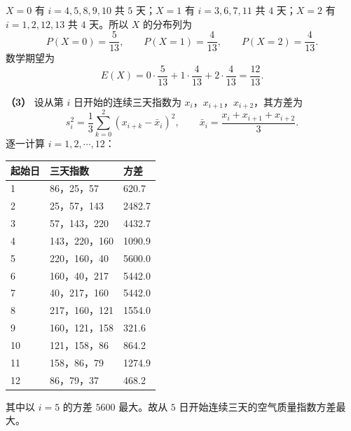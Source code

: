 \begin{answer}
$X=0$ 有 $i=4,5,8,9,10$ 共 $5$ 天；$X=1$ 有 $i=3,6,7,11$ 共 $4$ 天；$X=2$ 有 $i=1,2,12,13$ 共 $4$ 天。所以 $X$ 的分布列为
\nopagebreak[4]
\[P(X=0)=\frac5{13},\qquad P(X=1)=\frac4{13},\qquad P(X=2)=\frac4{13}.\]
数学期望为
\nopagebreak[4]
\[E(X)=0\cdot\frac5{13}+1\cdot\frac4{13}+2\cdot\frac4{13}=\frac{12}{13}.\]

\textbf{（3）} 设从第 $i$ 日开始的连续三天指数为 $x_i$，$x_{i+1}$，$x_{i+2}$，其方差为
\nopagebreak[4]
\[s_i^2=\frac13\sum_{k=0}^{2}\left(x_{i+k}-\bar x_i\right)^2,\qquad \bar x_i=\frac{x_i+x_{i+1}+x_{i+2}}3.\]
逐一计算 $i=1,2,\cdots,12$：

\begin{center}
\begin{tabular}{lll}
\toprule
起始日 & 三天指数 & 方差 \\
\midrule
1 & 86，25，57 & 620.7 \\
2 & 25，57，143 & 2482.7 \\
3 & 57，143，220 & 4432.7 \\
4 & 143，220，160 & 1090.9 \\
5 & 220，160，40 & 5600.0 \\
6 & 160，40，217 & 5442.0 \\
7 & 40，217，160 & 5442.0 \\
8 & 217，160，121 & 1554.0 \\
9 & 160，121，158 & 321.6 \\
10 & 121，158，86 & 864.2 \\
11 & 158，86，79 & 1274.9 \\
12 & 86，79，37 & 468.2 \\
\bottomrule
\end{tabular}
\end{center}

其中以 $i=5$ 的方差 $5600$ 最大。故从 $5$ 日开始连续三天的空气质量指数方差最大。




\end{answer}

